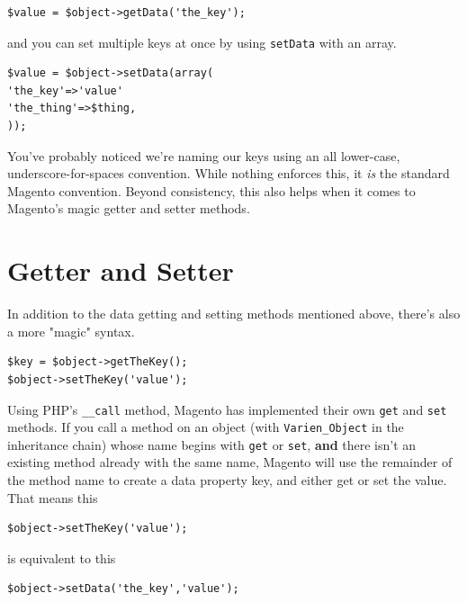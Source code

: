 \documentclass[oneside]{book}
\begin{document}
\begin{lstlisting}
$value = $object->getData('the_key');

\end{lstlisting}


and you can set multiple keys at once by using \footnotesize\texttt{setData} \normalsize  with an array.

\begin{lstlisting}
$value = $object->setData(array(
'the_key'=>'value'
'the_thing'=>$thing,
));

\end{lstlisting}


You've probably noticed we're naming our keys using an all lower-case, underscore-for-spaces convention.  While nothing enforces this, it \emph{is} the standard Magento convention.  Beyond consistency, this also helps when it comes to Magento's magic getter and setter methods.

\section{Getter and Setter}

In addition to the data getting and setting methods mentioned above, there's also a more "magic" syntax.

\begin{lstlisting}
$key = $object->getTheKey();    
$object->setTheKey('value');

\end{lstlisting}


Using PHP's \footnotesize\texttt{\_\_call} \normalsize  method, Magento has implemented their own \footnotesize\texttt{get} \normalsize  and \footnotesize\texttt{set} \normalsize  methods.  If you call a method on an object (with \footnotesize\texttt{Varien\_Object} \normalsize in the inheritance chain) whose name begins with \footnotesize\texttt{get} \normalsize  or \footnotesize\texttt{set}\normalsize, \textbf{and} there isn't an existing method already with the same name, Magento will use the remainder of the method name to create a data property key, and either get or set the value.  That means this

\begin{lstlisting}
$object->setTheKey('value');

\end{lstlisting}


is equivalent to this   

\begin{lstlisting}
$object->setData('the_key','value');

\end{lstlisting}
\end{document}
